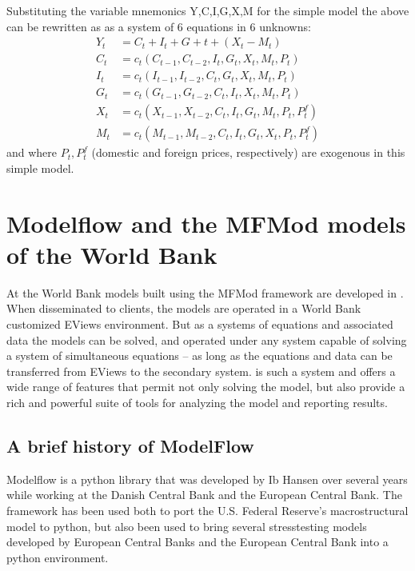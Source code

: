 \documentclass[letterpaper,10pt,english]{jupyterBook}
\begin{document}
\sphinxAtStartPar
Substituting the variable mnemonics Y,C,I,G,X,M for the simple model the above can be rewritten as as a system of 6 equations in 6 unknowns:
\label{equation:content/02_MacrostructuralModels/MacroStructuralModels:130a8588-34c5-4c16-904d-7c1106c2b8a6}\begin{align}
Y_t  &=  C_t+I_t+G+t+ (X_t-M_t) \\
C_t &= c_t(C_{t-1},C_{t-2},I_t,G_t,X_t,M_t,P_t)\\
I_t &= c_t(I_{t-1},I_{t-2},C_t,G_t,X_t,M_t,P_t)\\
G_t &= c_t(G_{t-1},G_{t-2},C_t,I_t,X_t,M_t,P_t)\\
X_t &= c_t(X_{t-1},X_{t-2},C_t,I_t,G_t,M_t,P_t,P^f_t)\\
M_t &= c_t(M_{t-1},M_{t-2},C_t,I_t,G_t,X_t,P_t,P^f_t)
\end{align}
\sphinxAtStartPar
and where \(P_t, P^f_t\) (domestic and foreign prices, respectively) are exogenous in this simple model.

\sphinxstepscope


\chapter{Modelflow and the MFMod models of the World Bank}
\label{\detokenize{content/02_MacrostructuralModels/MFModAndModelFlow:modelflow-and-the-mfmod-models-of-the-world-bank}}\label{\detokenize{content/02_MacrostructuralModels/MFModAndModelFlow::doc}}
\sphinxAtStartPar
At the World Bank models built using the MFMod framework are developed in . When disseminated to clients, the models are operated in a World Bank customized EViews environment. But as a systems of equations and associated data the models can be solved, and operated under any system capable of solving a system of simultaneous equations – as long as the equations and data can be transferred from EViews to the secondary system.  is such a system and offers a wide range of features that permit not only solving the model, but also provide a rich and powerful suite of tools for analyzing the model and reporting results.


\section{A brief history of ModelFlow}
\label{\detokenize{content/02_MacrostructuralModels/MFModAndModelFlow:a-brief-history-of-modelflow}}
\sphinxAtStartPar
Modelflow is a python library that was developed by Ib Hansen over several years while working at the Danish Central Bank and the European Central Bank. The framework has been used both to port the U.S. Federal Reserve’s macro\sphinxhyphen{}structural  model to python, but also been used to bring several stress\sphinxhyphen{}testing models developed by European Central Banks and the European Central Bank into a python environment.
\end{document}
